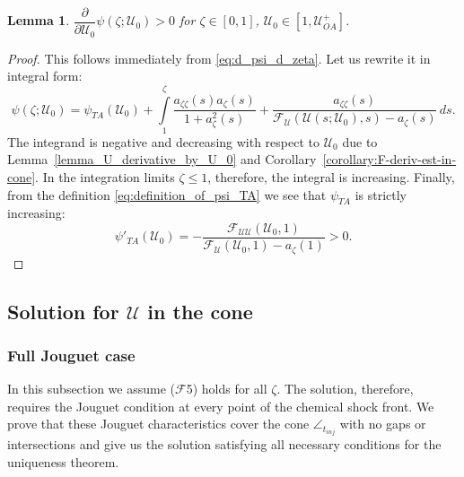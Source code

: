 \documentclass[12pt]{article}
\newtheorem{lemma}{Lemma}
\theoremstyle{definition}
\begin{document}
\begin{lemma}
\label{lemma:dpsi_dU0}
$\dfrac{\partial}{\partial \mathcal U_0}\psi(\zeta; \mathcal U_0) > 0$  for $\zeta\in[0,1]$, $\mathcal U_0\in[1, \mathcal U^+_{OA}]$.
\end{lemma}
\begin{proof}
This follows immediately from \eqref{eq:d_psi_d_zeta}. Let us rewrite it in integral form:
\[
\psi(\zeta; \mathcal U_0) = \psi_{TA}(\mathcal U_0) + \int\limits_{1}^\zeta \frac{a_{\zeta\zeta}(s)a_\zeta(s)}{1 + a_\zeta^2(s)} + \frac{a_{\zeta\zeta}(s)}{\mathcal F_{\mathcal U}(\mathcal U(s; \mathcal U_0), s) - a_\zeta(s)} \, ds.
\]
The integrand is negative and decreasing with respect to $\mathcal U_0$ due to Lemma~\ref{lemma_U_derivative_by_U_0} and Corollary~\ref{corollary:F-deriv-est-in-cone}. In the integration limits $\zeta \leqslant 1$, therefore, the integral is increasing. Finally, from the definition \eqref{eq:definition_of_psi_TA} we see that $\psi_{TA}$ is strictly increasing:
\[
\psi'_{TA}(\mathcal U_0) = -\dfrac{\mathcal F_{\mathcal U\mathcal U}(\mathcal U_0, 1)}{\mathcal F_{\mathcal U}(\mathcal U_0, 1) - a_\zeta(1)} > 0.
\]
\end{proof}


\subsection{Solution for $\mathcal U$ in the cone}

\subsubsection{Full Jouguet case}

In this subsection we assume ($\mathcal F$5) holds for all $\zeta$. The solution, therefore, requires the Jouguet condition at every point of the chemical shock front. We prove that these Jouguet characteristics cover the cone $\angle_{t_{inj}}$ with no gaps or intersections and give us the solution satisfying all necessary conditions for the uniqueness theorem.
\end{document}
